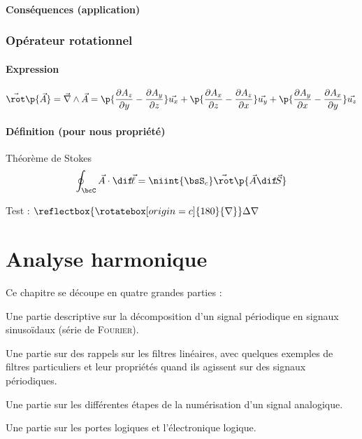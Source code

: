     \subsubsection{Conséquences (application)}
    
    \subsection{Opérateur rotationnel}
    
    \subsubsection{Expression}
    
    \[ \Vec{\rot}\p{\vec{A}} = \vec{\nabla} \land \vec{A} = \p{\dfrac{\partial A_z}{\partial y} - \dfrac{\partial A_y}{\partial z}}\vec{u_x} + \p{\dfrac{\partial A_x}{\partial z} - \dfrac{\partial A_z}{\partial x}}\vec{u_y} + \p{\dfrac{\partial A_y}{\partial x} - \dfrac{\partial A_x}{\partial y}}\vec{u_z}\]
    
    \subsubsection{Définition (pour nous propriété)}
    
    \begin{theorem}{Théorème de Stokes}{}
        \[ \oint_\bcC \vec{A} \cdot \dif\!\vec{\ell} = \niint {\bsS_c} \vec{\rot}\p{\vec{A} \dif\!\vec{S}}\]
    \end{theorem}
    
    Test : $\reflectbox{\rotatebox[origin=c]{180}{\nabla}} \Delta \nabla$
    
    \chapter{Analyse harmonique}%
    
    Ce chapitre se découpe en quatre grandes parties :
    \begin{enumerate}
        \itt Une partie descriptive sur la décomposition d'un signal périodique en signaux sinusoïdaux (série de \textsc{Fourier}).
        
        \itt Une partie sur des rappels sur les filtres linéaires, avec quelques exemples de filtres particuliers et leur propriétés quand ils agissent sur des signaux périodiques.
        
        \itt Une partie sur les différentes étapes de la numérisation d'un signal analogique.
        
        \itt Une partie sur les portes logiques et l'électronique logique.
    \end{enumerate}
    
